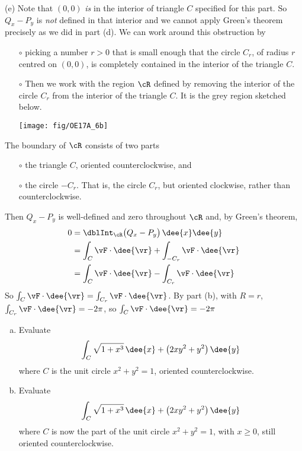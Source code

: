 \begin{solution}
(e) Note that $(0,0)$ \emph{is} in the interior of triangle $C$ specified
for this part. So $Q_x - P_y$ is \emph{not} defined in that interior
and we cannot apply Green's theorem precisely as we did in part (d).
We can work around this obstruction by
\begin{itemize}\itemsep1pt \parskip0pt  %
\item[$\circ$]
picking a number $r>0$ that is small
enough that the circle $C_r$, of radius $r$ centred on $(0,0)$,
is completely contained in the interior of the triangle $C$.
\item[$\circ$]
Then we work with
the region $\cR$ defined by removing the interior of the circle $C_r$
from the interior of the triangle $C$. It is the grey region sketched below.
\begin{center}
     \texttt{[image: fig/OE17A\_6b]}
\end{center}
\end{itemize}
The boundary of $\cR$ consists of two parts
\begin{itemize}\itemsep1pt \parskip0pt  %
\item[$\circ$]
the triangle $C$, oriented counterclockwise, and
\item[$\circ$]
the circle $-C_r$. That is, the circle $C_r$, but oriented clockwise,
rather than counterclockwise.
\end{itemize}
Then $Q_x-P_y$ is well-defined and zero throughout $\cR$ and,
by Green's theorem,
\begin{align*}
   0 &=\dblInt_\cR \big(Q_x-P_y\big)\,\dee{x}\dee{y} \\
    &= \int_C \vF\cdot\dee{\vr}
             + \int_{-C_r} \vF\cdot\dee{\vr} \\
    &= \int_C \vF\cdot\dee{\vr}
             - \int_{C_r} \vF\cdot\dee{\vr}
\end{align*}
So $\int_C \vF\cdot\dee{\vr} = \int_{C_r} \vF\cdot\dee{\vr} $.
By part (b), with $R=r$, $\int_{C_r} \vF\cdot\dee{\vr}=-2\pi$, so
$\int_C \vF\cdot\dee{\vr} = -2\pi$
\end{solution}

\begin{question}[M317 2017D] %
\begin{enumerate}[(a)]
\item
Evaluate
\begin{equation*}
\int_C \sqrt{1+x^3}\,\dee{x} +\big(2xy^2 + y^2\big)\,\dee{y}
\end{equation*}
where $C$ is the unit circle $x^2+y^2 = 1$, oriented counterclockwise.

\item
Evaluate
\begin{equation*}
\int_C \sqrt{1+x^3}\,\dee{x} +\big(2xy^2 + y^2\big)\,\dee{y}
\end{equation*}
where $C$ is now the part of the unit circle $x^2+y^2 = 1$, with $x\ge 0$,
still oriented counterclockwise.
\end{enumerate}
\end{question}

